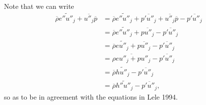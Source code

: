 \documentclass[oneside,a4paper,11pt]{report}
\newcommand{\rhoavg}{\overline{\rho}}
\newcommand{\pavg}{\overline{p}}
\newcommand{\pfluc}{p'}
\newcommand{\eflucf}{e''}
\newcommand{\uflucf}{u''}
\begin{document}
Note that we can write
\begin{align}
    \rhoavg \widetilde{ \eflucf \uflucf_j } + \overline{ \uflucf_j } \pavg &= \rhoavg \widetilde{ \eflucf \uflucf_j } + \overline{ \pfluc \uflucf_j } + \overline{ \uflucf_j } \pavg - \overline{ \pfluc \uflucf_j } \nonumber \\ 
    &= \rhoavg \widetilde{ \eflucf \uflucf_j } + \overline{ p \uflucf_j } - \overline{ \pfluc \uflucf_j } \nonumber \\
    &=  \rhoavg \widetilde{ e \uflucf_j} + \overline{ p \uflucf_j } - \overline{ \pfluc \uflucf_j } \nonumber \\
    &=\overline{ \rho e\uflucf_j + p\uflucf_j} - \overline{ \pfluc \uflucf_j } \nonumber \\
    &= \rhoavg \widetilde{ h \uflucf_j} - \overline{ \pfluc \uflucf_j } \nonumber \\
    &= \rhoavg \widetilde{ h'' \uflucf_j } - \overline{ \pfluc \uflucf_j } ,
\end{align}
so as to be in agreement with the equations in Lele 1994.

\end{document}
